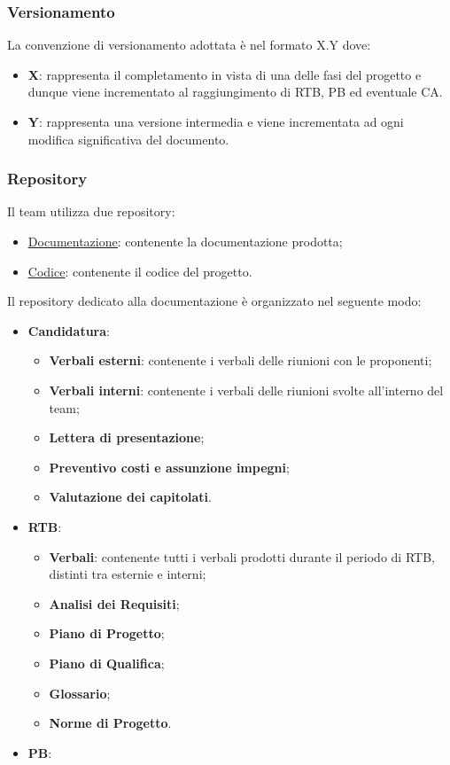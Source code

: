 \subsubsection{Versionamento}
La convenzione di versionamento adottata è nel formato X.Y dove:
\begin{itemize}
	\item \textbf{X}: rappresenta il completamento in vista di una delle fasi del progetto e dunque viene incrementato al raggiungimento di
	      RTB, PB ed eventuale CA.
	\item \textbf{Y}: rappresenta una versione intermedia e viene incrementata ad ogni modifica significativa del documento.
\end{itemize}

\subsubsection{Repository}
Il team utilizza due repository:
\begin{itemize}
	\item \href{https://github.com/7Last/docs.git}{\underline{Documentazione}}: contenente la documentazione prodotta;
	\item \href{https://github.com/7Last/7Last.github.io.git}{\underline{Codice}}: contenente il codice del progetto.
\end{itemize}

Il repository dedicato alla documentazione è organizzato nel seguente modo:
\begin{itemize}
	\item \textbf{Candidatura}:
	      \begin{itemize}
		      \item \textbf{Verbali esterni}: contenente i verbali delle riunioni con le proponenti;
		      \item \textbf{Verbali interni}: contenente i verbali delle riunioni svolte all'interno del team;
		      \item \textbf{Lettera di presentazione};
		      \item \textbf{Preventivo costi e assunzione impegni};
		      \item \textbf{Valutazione dei capitolati}.
	      \end{itemize}
	\item \textbf{RTB}:
	      \begin{itemize}
		      \item \textbf{Verbali}: contenente tutti i verbali prodotti durante il periodo di RTB, distinti tra esternie e interni;
		      \item \textbf{Analisi dei Requisiti};
		      \item \textbf{Piano di Progetto};
		      \item \textbf{Piano di Qualifica};
		      \item \textbf{Glossario};
		      \item \textbf{Norme di Progetto}.
	      \end{itemize}
	\item \textbf{PB}:
\end{itemize}

